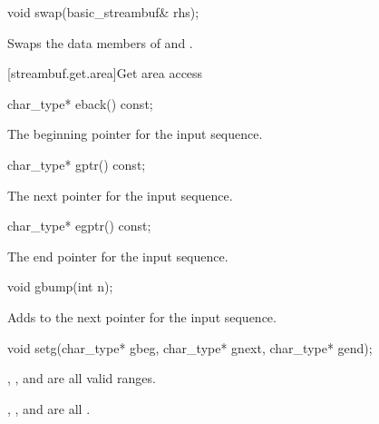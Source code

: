 %
\begin{itemdecl}
void swap(basic_streambuf& rhs);
\end{itemdecl}

\begin{itemdescr}
\pnum
\effects
Swaps the data members of 
and .
\end{itemdescr}

[streambuf.get.area]{Get area access}

%
\begin{itemdecl}
char_type* eback() const;
\end{itemdecl}

\begin{itemdescr}
\pnum
\returns
The beginning pointer for the input sequence.
\end{itemdescr}

%
\begin{itemdecl}
char_type* gptr() const;
\end{itemdecl}

\begin{itemdescr}
\pnum
\returns
The next pointer for the input sequence.
\end{itemdescr}

%
\begin{itemdecl}
char_type* egptr() const;
\end{itemdecl}

\begin{itemdescr}
\pnum
\returns
The end pointer for the input sequence.
\end{itemdescr}

%
\begin{itemdecl}
void gbump(int n);
\end{itemdecl}

\begin{itemdescr}
\pnum
\effects
Adds  to the next pointer for the input sequence.
\end{itemdescr}

%
\begin{itemdecl}
void setg(char_type* gbeg, char_type* gnext, char_type* gend);
\end{itemdecl}

\begin{itemdescr}
\pnum
\expects
{}, , and 
are all valid ranges.

\pnum
\ensures
{},
,
and
 are all .
\end{itemdescr}

